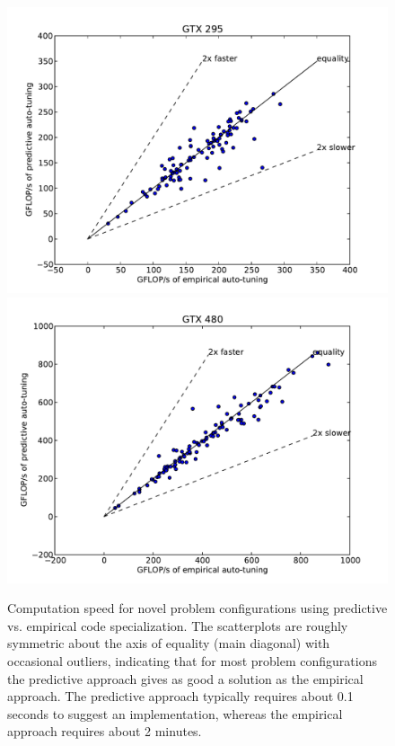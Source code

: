 \documentclass{sig-alternate}
\begin{document}
\begin{figure}
\centering
\includegraphics[scale=.42]{fig_gflop_scatter_295.pdf}
\includegraphics[scale=.42]{fig_gflop_scatter_480.pdf}
\caption{Computation speed for novel problem configurations using predictive
vs. empirical code specialization.
The scatterplots are roughly symmetric about the axis of equality (main diagonal)
with occasional outliers, indicating that for most problem configurations the
predictive approach gives as good a solution as the empirical approach.
The predictive approach typically requires about 0.1 seconds to suggest an
implementation, whereas the empirical approach requires about 2 minutes.
}
\label{fig:fig_gflop_scatter}
\end{figure}
\end{document}
